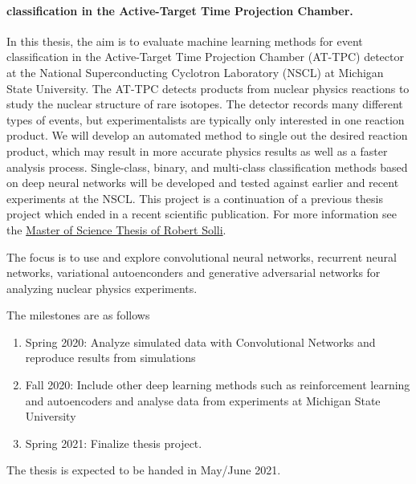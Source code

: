 \documentclass[%
oneside,                 %
final,                   %
10pt]{article}
\begin{document}
\paragraph{classification in the Active-Target Time Projection Chamber.}
In this thesis, the aim is to evaluate machine learning methods for
event classification in the Active-Target Time Projection Chamber
(AT-TPC) detector at the National Superconducting Cyclotron Laboratory
(NSCL) at Michigan State University. The AT-TPC detects products from
nuclear physics reactions to study the nuclear structure of rare
isotopes. The detector records many different types of events, but
experimentalists are typically only interested in one reaction
product. We will develop an automated method to single out the desired
reaction product, which may result in more accurate physics results as
well as a faster analysis process. Single-class, binary, and
multi-class classification methods based on deep neural networks will
be developed and tested against earlier and recent experiments at the
NSCL.  This project is a continuation of a previous thesis project which ended in a recent scientific publication.
For more information see the \href{{https://github.com/copperwire/thesis/blob/master/main.pdf}}{Master of Science Thesis of Robert Solli}.


The focus is to  use and explore convolutional neural networks, recurrent neural networks, variational
autoenconders and generative adversarial networks for analyzing nuclear physics experiments.



The milestones are as follows

\begin{enumerate}
\item Spring 2020: Analyze simulated data with Convolutional Networks and reproduce results from simulations

\item Fall 2020: Include other deep learning methods such as reinforcement learning and autoencoders and analyse data from experiments at Michigan State University

\item Spring 2021: Finalize thesis project.
\end{enumerate}

\noindent
The thesis is expected to be handed in May/June  2021.





































\end{document}
